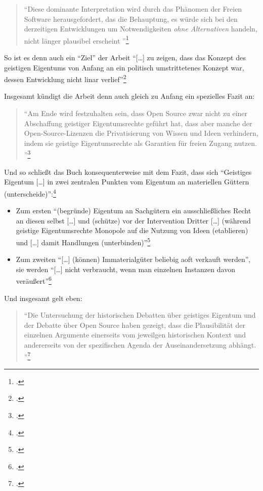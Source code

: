 \documentclass[DIV=calc,BCOR=5mm,11pt,headings=small,oneside,abstract=true, toc=bib]{scrartcl}
\begin{document}
\begin{quote}
\enquote{Diese dominante Interpretation wird durch das Phänomen der Freien
Software herausgefordert, das die Behauptung, es würde sich bei den derzeitigen
Entwicklungen um Notwendigkeiten \emph{ohne Alternativen} handeln, nicht länger
plausibel erscheint
}\footcite[][9; herv.i.O]{Eckl2004a}
\end{quote}

So ist es denn auch ein \enquote{Ziel} der Arbeit \enquote{[\ldots] zu
zeigen, dass das Konzept des geistigen Eigentums von Anfang an ein
politisch umstrittetenes Konzept war, dessen Entwicklung nicht linar
verlief}\footcite[vgl.][12]{Eckl2004a}

Insgesamt kündigt die Arbeit denn auch gleich zu Anfang ein spezielles Fazit an:

\begin{quote}
\enquote{Am Ende wird festzuhalten sein, dass Open Source zwar nicht zu einer
Abschaffung geistiger Eigentumsrechte geführt hat, dass aber manche der
Open-Source-Lizenzen die Privatisierung von Wissen und Ideen verhindern, indem
sie geistige Eigentumsrechte als Garantien für freien Zugang nutzen.
}\footcite[][14]{Eckl2004a}
\end{quote}

Und so schließt das Buch konsequenterweise mit dem Fazit, dass sich
\enquote{Geistiges Eigentum [\ldots] in zwei zentralen Punkten vom Eigentum
an materiellen Güttern (unterscheide)}:\footcite[][139]{Eckl2004a}
\begin{itemize}
  \item Zum ersten \enquote{(begründe) Eigentum an Sachgütern ein ausschließliches
  Recht an diesen selbst [\ldots] und (schütze) vor der Intervention Dritter
  [\ldots] (während geistige Eigentumsrechte Monopole auf die Nutzung von Ideen
  (etablieren) und [\ldots] damit Handlungen
  (unterbinden)}\footcite[][139]{Eckl2004a}
  \item Zum zweiten \enquote{[\ldots] (können) Immaterialgüter beliebig
  aoft verkauft werden}, sie werden \enquote{[\ldots] nicht
  verbraucht, wenn man einzelnen Instanzen davon
  veräußert}\footcite[][139]{Eckl2004a}
\end{itemize}

Und insgesamt gelt eben:

\begin{quote}
\enquote{Die Untersuchung der historischen Debatten über geistiges Eigentum und
der Debatte über Open Source haben gezeigt, dass die Plausibilität der einzelnen
Argumente einerseits vom jeweilgen historischen Kontext und andererseits von der
spezifischen Agenda der Auseinandersetzung abhängt.
}\footcite[][140]{Eckl2004a}
\end{quote}
\end{document}
